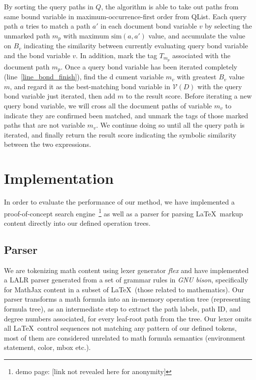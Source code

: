 \documentclass{acm_proc_article-sp}
\begin{document}
By sorting the query paths in $Q$, the algorithm is able to take out paths from same bound variable in maximum-occurrence-first order from QList. 
Each query path $a$ tries to match a path $a'$ in each document bond variable $v$ by selecting the unmarked path $m_p$ with maximum $\mathrm{sim}(a,a')$ value, and accumulate the value on $B_v$ indicating the similarity between currently evaluating query bond variable and the bond variable $v$.
In addition, mark the tag $T_{m_p}$ associated with the document path $m_p$.
Once a query bond variable has been iterated completely (line~\ref{line_bond_finish}),
find the d cument variable $m_v$ with greatest $B_v$ value $m$, and regard it as the best-matching bond variable in $\mathcal{V}(D)$ with the query bond variable just iterated, then add $m$ to the result score.
Before iterating a new query bond variable, we will cross all the document paths of variable $m_v$ to indicate they are confirmed been matched, 
and unmark the tags of those marked paths that are not variable $m_v$.
We continue doing so until all the query path is iterated, and finally return the result score indicating the symbolic similarity between the two expressions.

\section{Implementation}
In order to evaluate the performance of our method, we have implemented a proof-of-concept search engine~\footnote{demo page: [link not revealed here for anonymity]} as well as a parser for parsing \LaTeX\ markup content directly into our defined operation trees.

\subsection{Parser}
We are tokenizing math content using lexer generator \textit{flex} and have implemented a LALR parser generated from a set of grammar rules in \textit{GNU bison}, specifically for MathJax content in a subset of \LaTeX\ (those related to mathematics).
Our parser transforms a math formula into an in-memory operation tree (representing formula tree), as an intermediate step to extract the path labels, path ID, and degree numbers associated, for every leaf-root path from the tree. 
Our lexer omits all \LaTeX\ control sequences not matching any pattern of our defined tokens, most of them are considered unrelated to math formula semantics (environment statement, color, mbox etc.).
\end{document}
